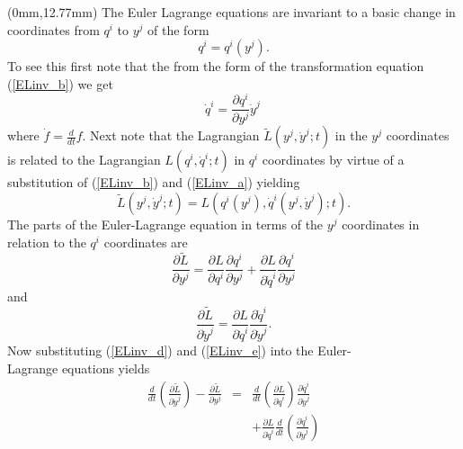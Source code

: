 \begin{textblock*}{65mm}(0mm,12.77mm)
The Euler Lagrange equations are invariant to a basic change in coordinates from $q^i$ to
$y^j$ of the form 
\begin{equation}\label{ELinv_b}
  q^i = q^i \left(y^j \right) .
\end{equation}
To see this first note that the from the 
form of the transformation equation (\ref{ELinv_b}) we get
\begin{equation}\label{ELinv_a}
  {\dot q}^i = \frac{\partial q^i}{\partial y^j} {\dot y}^j \,
\end{equation}
where $\dot f = \frac{d}{dt} f$. Next note that the Lagrangian 
$\tilde L \left(y^j,{\dot y}^j;t \right)$ in the $y^j$ coordinates 
is related to the Lagrangian $L \left(q^i,{\dot q}^i;t \right)$ 
in $q^i$ coordinates by virtue of a substitution of (\ref{ELinv_b}) 
and (\ref{ELinv_a}) yielding
\begin{equation}\label{ELinv_c}
  \tilde L \left(y^j,{\dot y}^j;t \right) = L \left(q^i(y^j),{\dot q}^i(y^j,{\dot y}^j);t \right) .
\end{equation}
The parts of the Euler-Lagrange equation in terms
of the $y^j$ coordinates in relation to the $q^i$ coordinates are
\begin{equation}\label{ELinv_d}
  \frac{\partial \tilde L}{\partial y^j} =    \frac{\partial L}{\partial q^i}        \frac{\partial q^i}{\partial y^j} 
                                        +  \frac{\partial L}{\partial {\dot q}^i} \frac{\partial {\dot q}^i}{\partial y^j}
\end{equation}
and
\begin{equation}\label{ELinv_e}
  \frac{\partial \tilde L}{\partial {\dot y}^j} = \frac{\partial L}{\partial {\dot q}^i} \frac{\partial {\dot q}^i}{\partial {\dot y}^j} .
\end{equation}
Now substituting (\ref{ELinv_d}) and (\ref{ELinv_e}) into the Euler-\\Lagrange equations
yields
\begin{eqnarray}\label{ELinv_f}
  \frac{d}{dt} \left( \frac{\partial \tilde L}{\partial {\dot y}^j } \right) - \frac{\partial \tilde L}{\partial y^j} 
    & = &   \frac{d}{d t} \left( \frac{\partial L}{\partial {\dot q}^i} \right) \frac{\partial {\dot q}^i}{\partial {\dot y}^j} \\ \nonumber
	&   & + \frac{\partial L}{\partial {\dot q}^i} \frac{d}{dt} \left( \frac{\partial {\dot q}^i}{\partial {\dot y}^j} \right) \\ \nonumber

\end{eqnarray}
\end{textblock*}
